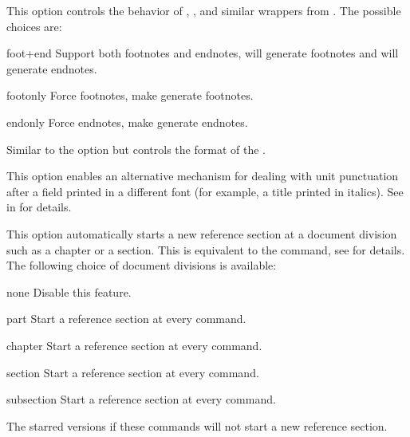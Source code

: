 \documentclass{ltxdockit}[2011/03/25]
\begin{document}
\begin{optionlist}
This option controls the behavior of , , and similar wrappers from . The possible choices are:

\begin{valuelist}
\item[foot+end] Support both footnotes and endnotes, \ie {} will generate footnotes and  will generate endnotes.
\item[footonly] Force footnotes, \ie make  generate footnotes.
\item[endonly] Force endnotes, \ie make  generate endnotes.
\end{valuelist}


Similar to the  option but controls the format of the .


This option enables an alternative mechanism for dealing with unit punctuation after a field printed in a different font (for example, a title printed in italics). See  in  for details.


This option automatically starts a new reference section at a document division such as a chapter or a section. This is equivalent to the  command, see  for details. The following choice of document divisions is available:

\begin{valuelist}
\item[none] Disable this feature.
\item[part] Start a reference section at every  command.
\item[chapter] Start a reference section at every  command.
\item[section] Start a reference section at every  command.
\item[subsection] Start a reference section at every  command.
\end{valuelist}
%
The starred versions if these commands will not start a new reference section.



\end{optionlist}
\end{document}
